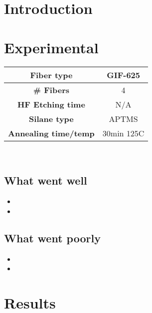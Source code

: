 \section{Introduction}

\section{Experimental}


\begin{center}
\begin{tabular}{| c | c |}
 \hline
 {\bf Fiber type} & GIF-625 \\ \hline
 {\bf # Fibers} & 4  \\ \hline
 {\bf HF Etching time} & N/A \\ \hline
 {\bf Silane type} & APTMS \\ \hline
 {\bf Annealing time/temp} & 30min 125C  \\ \hline
\end{tabular}
\end{center}

\\


\subsection{What went well}

\begin{itemize}
\item{}
\item{}
\end{itemize}

\subsection{What went poorly}

\begin{itemize}
\item{}
\item{}
\end{itemize}

\section{Results}

